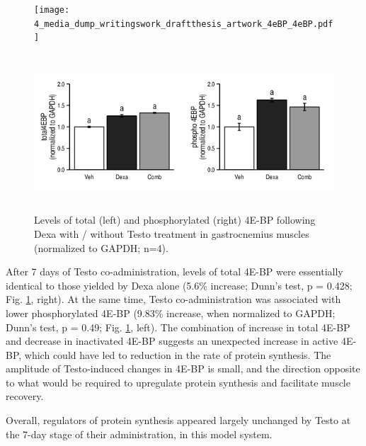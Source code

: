 \documentclass[12pt,english]{report}\usepackage[]{graphicx}\usepackage[]{color}
\newenvironment{knitrout}{}{} %
\begin{document}
\begin{figure}
\begin{minipage}[t][2in][c]{6in}%
\texttt{[image: 4\_media\_dump\_writingswork\_draftthesis\_artwork\_4eBP\_4eBP.pdf]}%
\end{minipage}

\begin{minipage}[t][2.2in][c]{6in}%
\begin{knitrout}
\color{fgcolor}
\includegraphics[width=6in,height=2.3in]{figure/fourebp-1} 

\end{knitrout}
%
\end{minipage}

\protect\caption[Levels of total and phosphorylated 4E-BP following Dexa with / without
Testo treatments.]{Levels of total (left) and phosphorylated (right) 4E-BP following
Dexa with / without Testo treatment in gastrocnemius muscles (normalized
to GAPDH; n=4)\label{fig:4EBP}.}
\end{figure}


After 7 days of Testo co-administration, levels of total 4E-BP were
essentially identical to those yielded by Dexa alone (5.6\%
increase; Dunn's test, p = 0.428;
Fig. \ref{fig:4EBP}, right). At the same time, Testo co-administration
was associated with lower phosphorylated 4E-BP (9.83\%
increase, when normalized to GAPDH; Dunn's test, p = 0.49;
Fig. \ref{fig:4EBP}, left). The combination of increase in total
4E-BP and decrease in inactivated 4E-BP suggests an unexpected increase
in active 4E-BP, which could have led to reduction in the rate of
protein synthesis. The amplitude of Testo-induced changes in 4E-BP
is small, and the direction opposite to what would be required to
upregulate protein synthesis and facilitate muscle recovery.

Overall, regulators of protein synthesis appeared largely unchanged
by Testo at the 7-day stage of their administration, in this model
system.
\end{document}
